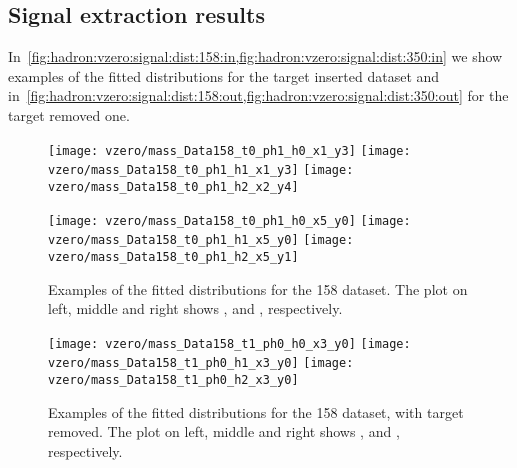 \subsection{Signal extraction results}
\label{sec:hadron:vzero:results}


In~\cref{fig:hadron:vzero:signal:dist:158:in,fig:hadron:vzero:signal:dist:350:in}
we show examples of the fitted \minv distributions
for the target inserted dataset and
in~\cref{fig:hadron:vzero:signal:dist:158:out,fig:hadron:vzero:signal:dist:350:out}
for the target removed one.


\begin{figure}[!ht]
  \centering
  \texttt{[image: vzero/mass\_Data158\_t0\_ph1\_h0\_x1\_y3]}
  \texttt{[image: vzero/mass\_Data158\_t0\_ph1\_h1\_x1\_y3]}
  \texttt{[image: vzero/mass\_Data158\_t0\_ph1\_h2\_x2\_y4]}

  \vspace{0.5cm}
    
  \texttt{[image: vzero/mass\_Data158\_t0\_ph1\_h0\_x5\_y0]}
  \texttt{[image: vzero/mass\_Data158\_t0\_ph1\_h1\_x5\_y0]}
  \texttt{[image: vzero/mass\_Data158\_t0\_ph1\_h2\_x5\_y1]}
  
  \caption{Examples of the fitted \minv distributions for the 158 \GeVc dataset. The plot on left, middle and right shows \lamb, \antilamb and \kzeros, respectively.}
  \label{fig:hadron:vzero:signal:dist:158:in}
\end{figure}


\begin{figure}[!ht]
  \centering
  \texttt{[image: vzero/mass\_Data158\_t1\_ph0\_h0\_x3\_y0]}
  \texttt{[image: vzero/mass\_Data158\_t1\_ph0\_h1\_x3\_y0]}
  \texttt{[image: vzero/mass\_Data158\_t1\_ph0\_h2\_x3\_y0]}
  
  \caption{Examples of the fitted \minv distributions for the 158 \GeVc dataset, with target removed. The plot on left, middle and right shows \lamb, \antilamb and \kzeros, respectively.}
  \label{fig:hadron:vzero:signal:dist:158:out}
\end{figure}

